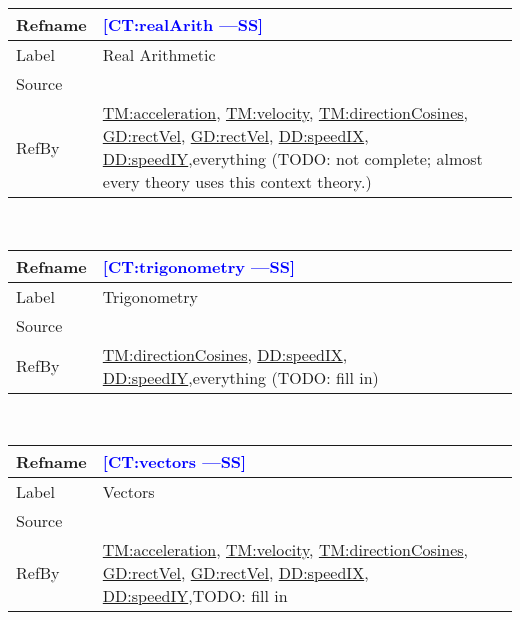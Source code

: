 \documentclass[12pt]{article}
\newcommand{\authornote}[3]{\textcolor{#1}{[#3 ---#2]}}
\newcommand{\authornote}[3]{}
\newcommand{\wss}[1]{\authornote{blue}{SS}{#1}}
\begin{document}
\medskip
\noindent
\begin{minipage}{\textwidth}
\begin{tabular}{>{\raggedright}p{}>{\raggedright\arraybackslash}p{}}
\toprule \textbf{Refname} & \textbf{\wss{CT:realArith}}
\label{CT:realArith}
\\ \midrule
Label & Real Arithmetic
\\ \midrule
Source & \cite{}
\\ \midrule
RefBy & \hyperref[TM:acceleration]{TM:acceleration},
\hyperref[TM:velocity]{TM:velocity},
\hyperref[TM:directionCosines]{TM:directionCosines},
\hyperref[GD:rectVel]{GD:rectVel}, \hyperref[GD:rectVel]{GD:rectVel}, \hyperref[DD:speedIX]{DD:speedIX}, \hyperref[DD:speedIY]{DD:speedIY},everything (TODO: not complete; almost every theory uses this context theory.)
\\ \bottomrule
\end{tabular}
\end{minipage}
~\\

\medskip
\noindent
\begin{minipage}{\textwidth}
\begin{tabular}{>{\raggedright}p{}>{\raggedright\arraybackslash}p{}}
\toprule \textbf{Refname} & \textbf{\wss{CT:trigonometry}}
\label{CT:trigonometry}
\\ \midrule
Label & Trigonometry
\\ \midrule
Source & \cite{}
\\ \midrule
RefBy & \hyperref[TM:directionCosines]{TM:directionCosines}, \hyperref[DD:speedIX]{DD:speedIX}, \hyperref[DD:speedIY]{DD:speedIY},everything (TODO: fill in)
\\ \bottomrule
\end{tabular}
\end{minipage}
~\\

\medskip
\noindent
\begin{minipage}{\textwidth}
\begin{tabular}{>{\raggedright}p{}>{\raggedright\arraybackslash}p{}}
\toprule \textbf{Refname} & \textbf{\wss{CT:vectors}}
\label{CT:vectors}
\\ \midrule
Label & Vectors
\\ \midrule
Source & \cite{}
\\ \midrule
RefBy & \hyperref[TM:acceleration]{TM:acceleration},
\hyperref[TM:velocity]{TM:velocity},
\hyperref[TM:directionCosines]{TM:directionCosines},
\hyperref[GD:rectVel]{GD:rectVel}, \hyperref[GD:rectVel]{GD:rectVel}, \hyperref[DD:speedIX]{DD:speedIX}, \hyperref[DD:speedIY]{DD:speedIY},TODO: fill in
\\ \bottomrule
\end{tabular}
\end{minipage}
~\\
\end{document}
